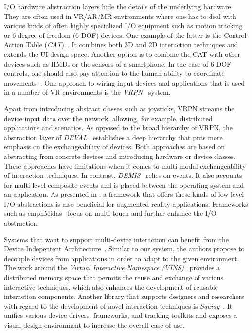 \documentclass[twoside,twocolumn,10pt]{article}
\begin{document}
%
%
I/O hardware abstraction layers hide the details of the underlying hardware. They are often used in VR/AR/MR environments where one has to deal with various kinds of often highly specialized I/O equipment such as motion tracking or 6 degree-of-freedom (6 DOF) devices. One example of the latter is the Control Action Table (\emph{CAT})~\cite{Hachet}. It combines both 3D and 2D interaction techniques and extends the UI design space. Another option is to combine the CAT with other devices such as HMDs or the sensors of a smartphone. In the case of 6 DOF controls, one should also pay attention to the human ability to coordinate movements~\cite{Zhai:1998:QCM:274644.274689}. One approach to wiring input devices and applications that is used in a number of VR environments is the \emph{VRPN}~\cite{Taylor:2001:VDN:505008.505019} system.



Apart from introducing abstract classes such as joysticks, VRPN streams the device input data over the network, allowing, for example, distributed applications and scenarios. As opposed to the broad hierarchy of VRPN, the abstraction layer of \emph{DEVAL}~\cite{Ohlenburg:2007:DDA:1766311.1766369} establishes a deep hierarchy that puts more emphasis on the exchangeability of devices. Both approaches are based on abstracting from concrete devices and introducing hardware or device classes. These approaches have limitations when it comes to multi-modal exchangeability of interaction techniques. In contrast, \emph{DEMIS}~\cite{Jiang} relies on events. It also accounts for multi-level composite events and is placed between the operating system and an application. As presented in \cite{970514}, a framework that offers these kinds of low-level I/O abstractions is also beneficial for augmented reality applications. Frameworks such as emph{Midas}~\cite{Scholliers:2010:MDM:1935701.1935712} focus on multi-touch and further enhance the I/O abstraction.



Systems that want to support multi-device interaction can benefit from the Device Indepentent Architecture~\cite{Chmielewski:2012:AAS:2405172.2405177}. Similar to our system, the authors propose to decouple devices from applications in order to adapt to the given environment. The work around the \emph{Virtual Interactive Namespace (VINS)}~\cite{VGH12} provides a distributed memory space that permits the reuse and exchange of various interactive techniques, which also enhances the development of reusable interaction components. Another library that supports designers and researchers with regard to the development of novel interaction techniques is \emph{Squidy}~\cite{Konig20108609394}. It unifies various device drivers, frameworks, and tracking toolkits and exposes a visual design environment to increase the overall ease of use.
\end{document}

